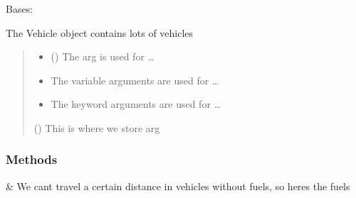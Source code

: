 \documentclass[letterpaper,10pt,english]{sphinxmanual}
\begin{document}
\begin{fulllineitems}
\label{\detokenize{_autosummary/module.submodule.dummycode.SphinxVehicle:module.submodule.dummycode.SphinxVehicle}}
\pysigstartsignatures
{}
\pysigstopsignatures
\sphinxAtStartPar
Bases: 

\sphinxAtStartPar
The Vehicle object contains lots of vehicles
\begin{quote}\begin{description}
\begin{itemize}
\item {} 
\sphinxAtStartPar
{} () \textendash{} The arg is used for …

\item {} 
\sphinxAtStartPar
{} \textendash{} The variable arguments are used for …

\item {} 
\sphinxAtStartPar
{} \textendash{} The keyword arguments are used for …

\end{itemize}

\sphinxAtStartPar
{} () \textendash{} This is where we store arg

\end{description}\end{quote}
\subsubsection*{Methods}


\begin{savenotes}\sphinxattablestart
\centering
\begin{tabulary}{\linewidth}[t]{}
\hline

\sphinxAtStartPar
{\hyperref[\detokenize{_autosummary/module.submodule.dummycode.SphinxVehicle:module.submodule.dummycode.SphinxVehicle.cars}]{}}
&
\sphinxAtStartPar
We can\textquotesingle{}t travel a certain distance in vehicles without fuels, so here\textquotesingle{}s the fuels
\\
\hline
\end{tabulary}
\par
\sphinxattableend\end{savenotes}


\end{fulllineitems}
\end{document}
